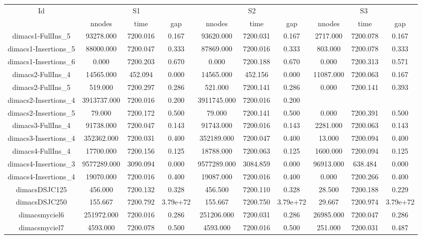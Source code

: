 \begin{sidewaystable}[h] \begin{tabular}{|c|ccc|ccc|ccc|}
\hline
\multicolumn{1}{|c|}{Id} & \multicolumn{3}{|c|}{S1} & \multicolumn{3}{|c|}{S2} & \multicolumn{3}{|c|}{S3}
\\
 & nnodes & time & gap & nnodes & time & gap & nnodes & time & gap
\\
\hline
dimacs1-FullIns\_5 & 93278.000 & 7200.016 & 0.167 & 93620.000 & 7200.031 & 0.167 & 2717.000 & 7200.078 & 0.167
\\
dimacs1-Insertions\_5 & 88000.000 & 7200.047 & 0.333 & 87869.000 & 7200.016 & 0.333 & 803.000 & 7200.078 & 0.333
\\
dimacs1-Insertions\_6 & 0.000 & 7200.203 & 0.670 & 0.000 & 7200.188 & 0.670 & 0.000 & 7200.313 & 0.571
\\
dimacs2-FullIns\_4 & 14565.000 & 452.094 & 0.000 & 14565.000 & 452.156 & 0.000 & 11087.000 & 7200.063 & 0.167
\\
dimacs2-FullIns\_5 & 519.000 & 7200.297 & 0.286 & 521.000 & 7200.141 & 0.286 & 0.000 & 7200.141 & 0.393
\\
dimacs2-Insertions\_4 & 3913737.000 & 7200.016 & 0.200 & 3911745.000 & 7200.016 & 0.200
\\
dimacs2-Insertions\_5 & 79.000 & 7200.172 & 0.500 & 79.000 & 7200.141 & 0.500 & 0.000 & 7200.391 & 0.500
\\
dimacs3-FullIns\_4 & 91738.000 & 7200.047 & 0.143 & 91743.000 & 7200.016 & 0.143 & 2281.000 & 7200.063 & 0.143
\\
dimacs3-Insertions\_4 & 352362.000 & 7200.031 & 0.400 & 352189.000 & 7200.047 & 0.400 & 13.000 & 7200.094 & 0.400
\\
dimacs4-FullIns\_4 & 17700.000 & 7200.156 & 0.125 & 18788.000 & 7200.063 & 0.125 & 1600.000 & 7200.094 & 0.125
\\
dimacs4-Insertions\_3 & 9577289.000 & 3090.094 & 0.000 & 9577289.000 & 3084.859 & 0.000 & 96913.000 & 638.484 & 0.000
\\
dimacs4-Insertions\_4 & 19070.000 & 7200.016 & 0.400 & 19087.000 & 7200.016 & 0.400 & 0.000 & 7200.266 & 0.400
\\
dimacsDSJC125 & 456.000 & 7200.132 & 0.328 & 456.500 & 7200.110 & 0.328 & 28.500 & 7200.188 & 0.229
\\
dimacsDSJC250 & 155.667 & 7200.792 & 3.79e+72 & 155.667 & 7200.750 & 3.79e+72 & 29.667 & 7200.974 & 3.79e+72
\\
dimacsmyciel6 & 251972.000 & 7200.016 & 0.286 & 251206.000 & 7200.031 & 0.286 & 26985.000 & 7200.047 & 0.286
\\
dimacsmyciel7 & 4593.000 & 7200.078 & 0.500 & 4593.000 & 7200.016 & 0.500 & 251.000 & 7200.031 & 0.487
\\
\hline 
 \end{tabular} \end{sidewaystable}